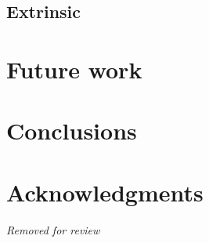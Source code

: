\documentclass[11pt]{article}
\begin{document}




\subsection{Extrinsic}

\section{Future work}



\section{Conclusions}


\section*{Acknowledgments}
\textit{Removed for review}




\end{document}
